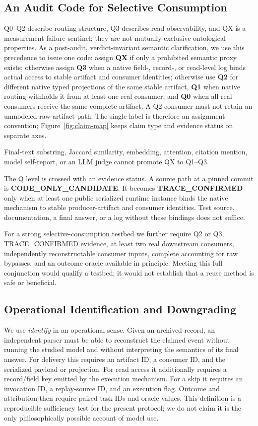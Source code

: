 \documentclass[letterpaper]{article} %
\begin{document}
\subsection{An Audit Code for Selective Consumption}

Q0--Q2 describe routing structure, Q3 describes read observability, and QX is
a measurement-failure sentinel; they are not mutually exclusive ontological
properties. As a post-audit, verdict-invariant semantic clarification, we use
this precedence to issue one code: assign \textbf{QX} if only a prohibited semantic proxy exists;
otherwise assign \textbf{Q3} when a native field-, record-, or read-level log
binds actual access to stable artifact and consumer identities; otherwise use
\textbf{Q2} for different native typed projections of the same stable artifact,
\textbf{Q1} when native routing withholds it from at least one real consumer,
and \textbf{Q0} when all real consumers receive the same complete artifact.
A Q2 consumer must not retain an unmodeled raw-artifact path. The single label
is therefore an assignment convention; Figure~\ref{fig:claim-map} keeps claim
type and evidence status on separate axes.

Final-text substring, Jaccard similarity, embedding, attention, citation
mention, model self-report, or an LLM judge cannot promote QX to Q1--Q3.

The Q level is crossed with an evidence status. A source path at a pinned
commit is \textbf{CODE\_ONLY\_CANDIDATE}. It becomes
\textbf{TRACE\_CONFIRMED} only when at least one public serialized runtime
instance binds the native mechanism to stable producer-artifact and consumer
identities. Test source, documentation, a final answer, or a log without these
bindings does not suffice.

For a strong selective-consumption testbed we further require Q2 or Q3,
TRACE\_CONFIRMED evidence, at least two real downstream consumers,
independently reconstructable consumer inputs, complete accounting for raw
bypasses, and an outcome oracle available in principle. Meeting this full
conjunction would qualify a testbed; it would not establish that a reuse method is safe or
beneficial.

\subsection{Operational Identification and Downgrading}

We use \emph{identify} in an operational sense. Given an archived record, an
independent parser must be able to reconstruct the claimed event without
running the studied model and without interpreting the semantics of its final
answer. For delivery this requires an artifact ID, a consumer ID, and the
serialized payload or projection. For read access it additionally requires a
record/field key emitted by the execution mechanism. For a skip it requires an
invocation ID, a replay-source ID, and an execution flag. Outcome and
attribution then require paired task IDs and oracle values. This definition is
a reproducible sufficiency test for the present protocol; we do not claim it is
the only philosophically possible account of model use.
\end{document}
